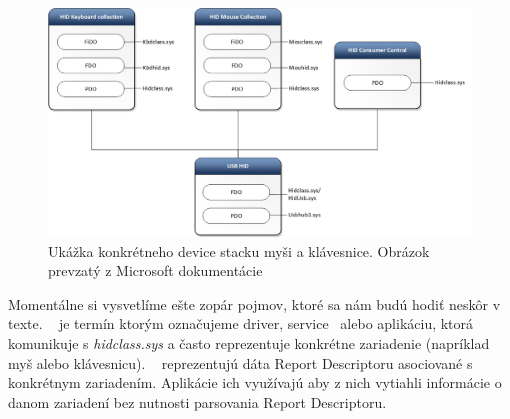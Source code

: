 \begin{figure}[!htb]
	\centering
	\includegraphics[width=\textwidth]{img/kap02_concrete_device_stack}
	\caption{Ukážka konkrétneho device stacku myši a klávesnice. Obrázok prevzatý z Microsoft dokumentácie~\cite{usb_msdn_hid_architecture}}
	\label{obr:kap2:concrete_dev_stack}
\end{figure}

Momentálne si vysvetlíme ešte zopár pojmov, ktoré sa nám budú hodiť neskôr v texte. ~\cite{usb_msdn_hid_client} je termín ktorým označujeme driver, service~\cite{usb_msdn_service} alebo aplikáciu, ktorá komunikuje s \textit{hidclass.sys} a často reprezentuje konkrétne zariadenie (napríklad myš alebo klávesnicu). ~\cite{usb_msdn_preparsed_data} reprezentujú dáta Report Descriptoru asociované s konkrétnym zariadením. Aplikácie ich využívajú aby z nich vytiahli informácie o danom zariadení bez nutnosti parsovania Report Descriptoru.